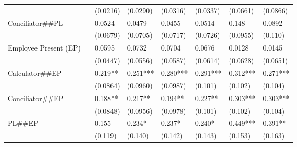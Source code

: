 \begin{tabular}{lrrrrrrr}
      & \multicolumn{1}{l}{} & \multicolumn{1}{l}{(0.0216)} & \multicolumn{1}{l}{(0.0290)} & \multicolumn{1}{l}{(0.0316)} & \multicolumn{1}{l}{(0.0337)} & \multicolumn{1}{l}{(0.0661)} & \multicolumn{1}{l}{(0.0866)} \\
Conciliator\#\#PL & \multicolumn{1}{l}{} & \multicolumn{1}{l}{0.0524} & \multicolumn{1}{l}{0.0479} & \multicolumn{1}{l}{0.0455} & \multicolumn{1}{l}{0.0514} & \multicolumn{1}{l}{0.148} & \multicolumn{1}{l}{0.0892} \\
      & \multicolumn{1}{l}{} & \multicolumn{1}{l}{(0.0679)} & \multicolumn{1}{l}{(0.0705)} & \multicolumn{1}{l}{(0.0717)} & \multicolumn{1}{l}{(0.0726)} & \multicolumn{1}{l}{(0.0955)} & \multicolumn{1}{l}{(0.110)} \\
Employee Present (EP) & \multicolumn{1}{l}{} & \multicolumn{1}{l}{0.0595} & \multicolumn{1}{l}{0.0732} & \multicolumn{1}{l}{0.0704} & \multicolumn{1}{l}{0.0676} & \multicolumn{1}{l}{0.0128} & \multicolumn{1}{l}{0.0145} \\
      & \multicolumn{1}{l}{} & \multicolumn{1}{l}{(0.0447)} & \multicolumn{1}{l}{(0.0556)} & \multicolumn{1}{l}{(0.0587)} & \multicolumn{1}{l}{(0.0614)} & \multicolumn{1}{l}{(0.0628)} & \multicolumn{1}{l}{(0.0651)} \\
Calculator\#\#EP & \multicolumn{1}{l}{} & \multicolumn{1}{l}{0.219**} & \multicolumn{1}{l}{0.251***} & \multicolumn{1}{l}{0.280***} & \multicolumn{1}{l}{0.291***} & \multicolumn{1}{l}{0.312***} & \multicolumn{1}{l}{0.271***} \\
      & \multicolumn{1}{l}{} & \multicolumn{1}{l}{(0.0864)} & \multicolumn{1}{l}{(0.0960)} & \multicolumn{1}{l}{(0.0987)} & \multicolumn{1}{l}{(0.101)} & \multicolumn{1}{l}{(0.102)} & \multicolumn{1}{l}{(0.104)} \\
Conciliator\#\#EP & \multicolumn{1}{l}{} & \multicolumn{1}{l}{0.188**} & \multicolumn{1}{l}{0.217**} & \multicolumn{1}{l}{0.194**} & \multicolumn{1}{l}{0.227**} & \multicolumn{1}{l}{0.303***} & \multicolumn{1}{l}{0.303***} \\
      & \multicolumn{1}{l}{} & \multicolumn{1}{l}{(0.0848)} & \multicolumn{1}{l}{(0.0956)} & \multicolumn{1}{l}{(0.0978)} & \multicolumn{1}{l}{(0.101)} & \multicolumn{1}{l}{(0.102)} & \multicolumn{1}{l}{(0.104)} \\
PL\#\#EP & \multicolumn{1}{l}{} & \multicolumn{1}{l}{0.155} & \multicolumn{1}{l}{0.234*} & \multicolumn{1}{l}{0.237*} & \multicolumn{1}{l}{0.240*} & \multicolumn{1}{l}{0.449***} & \multicolumn{1}{l}{0.391**} \\
      & \multicolumn{1}{l}{} & \multicolumn{1}{l}{(0.119)} & \multicolumn{1}{l}{(0.140)} & \multicolumn{1}{l}{(0.142)} & \multicolumn{1}{l}{(0.143)} & \multicolumn{1}{l}{(0.153)} & \multicolumn{1}{l}{(0.163)} \\

\end{tabular}
